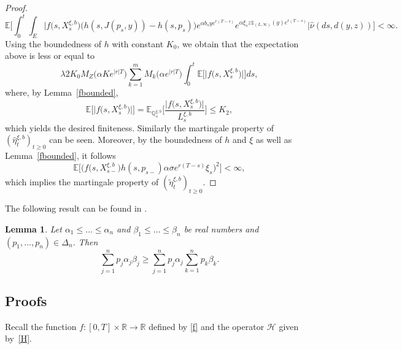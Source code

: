 \documentclass[reqno, 11pt]{amsart}%
\newcommand{\R}{\mathbb{R}}
\newcommand{\Eop}{\mathbb{E}}
\newcommand{\Q}{\mathbb{Q}}
\newtheorem{lemma}[theorem]{Lemma}
\theoremstyle{definition}
\numberwithin{equation}{section} \numberwithin{theorem}{section}
\begin{document}
\begin{proof}
\begin{equation*}
\Eop\bigg[\int_0^t\!\! \int_E\!\Big| f\big(s,X^{\xi,b}_{s}\big)\big(h(s,J(p_{s},y))-h(s,p_{s})\big)e^{\alpha b_s y e^{r(T-s)}}e^{\alpha \xi_s z \mathds{1}_{(L,\infty)}(y) e^{r(T-s)}}\Big| \hat\nu(ds,d(y,z))\bigg] <\infty.
\end{equation*}
Using the boundedness of $h$ with constant $K_0$, we obtain that the expectation above is less or equal to
\begin{equation*}
\lambda 2K_0 M_Z\big(\alpha K e^{|r|T}\big)\sum_{k=1}^m M_k\big(\alpha e^{|r|T}\big)\int_0^t \Eop\big[\big|f\big(s,X^{\xi,b}_{s}\big)\big|\big]ds,
\end{equation*}
where, by Lemma~\ref{fbounded},
\begin{equation*}
\Eop\big[\big|f\big(s,X^{\xi,b}_{s}\big)\big|\big] = \Eop_{\Q_s^{\xi,b}}\bigg[\frac{\big|f\big(s,X^{\xi,b}_{s}\big)\big|}{L_s^{\xi,b}}\bigg] \le K_2,
\end{equation*}
which yields the desired finiteness.
Similarly the martingale property of $(\hat\eta^{\xi,b}_t)_{t\ge0}$ can be seen.
Moreover, by the boundedness of $h$ and $\xi$ as well as Lemma~\ref{fbounded}, it follows
$$\Eop\Big[\big(f\big(s,X^{\xi,b}_{s-}\big)h(s,p_{s-})\alpha \sigma e^{r(T-s)} \xi_s\big)^2\Big]<\infty,$$
which implies the martingale property of $(\tilde\eta^{\xi,b}_t)_{t\ge0}$.
\end{proof}



The following result can be found in \cite{Mitrinovic1993}.

\begin{lemma}\label{le:ineqsum}
	Let $\alpha_1\le \ldots \le \alpha_n$ and $\beta_1\le\ldots\le\beta_n$ be real numbers and $(p_1,\ldots,p_n)\in\Delta_n$. Then
	\begin{equation*}
	\sum_{j=1}^n p_j\alpha_j\beta_j \ge \sum_{j=1}^n p_j\alpha_j\sum_{k=1}^n p_k\beta_k.
	\end{equation*}
\end{lemma}




\subsection{Proofs}

Recall the function $f:[0,T]\times\R\to\R$ defined by \eqref{f} and the operator $\mathcal{H}$ given by~\eqref{H}.
\end{document}

